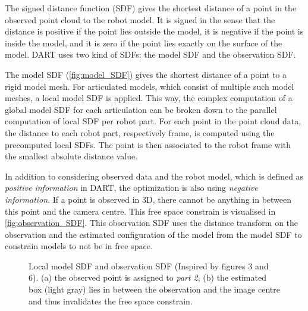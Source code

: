 The signed distance function (SDF) gives the shortest distance of a point in the observed point cloud to the robot model. It is signed in the sense that the distance is positive if the point lies outside the model, it is negative if the point is inside the model, and it is zero if the point lies exactly on the surface of the model. DART uses two kind of SDFs: the model SDF and the observation SDF.

The model SDF (\cref{fig:model_SDF}) gives the shortest distance of a point to a rigid model mesh. For articulated models, which consist of multiple such model meshes, a local model SDF is applied. This way, the complex computation of a global model SDF for each articulation can be broken down to the parallel computation of local SDF per robot part. For each point in the point cloud data, the distance to each robot part, respectively frame, is computed using the precomputed local SDFs. The point is then associated to the robot frame with the smallest absolute distance value.

In addition to considering observed data and the robot model, which is defined as \textit{positive information} in DART, the optimization is also using \textit{negative information}. If a point is observed in 3D, there cannot be anything in between this point and the camera centre. This free space constrain is visualised in \cref{fig:observation_SDF}. This observation SDF uses the distance transform on the observation and the estimated configuration of the model from the model SDF to constrain models to not be in free space.

\begin{figure}
\centering
{}
\caption[Signed Distance Function]{Local model SDF and observation SDF (Inspired by \cite{Schmidt2015} figures 3 and 6). (a) the observed point is assigned to \emph{part 2}, (b) the estimated box (light gray) lies in between the observation and the image centre and thus invalidates the free space constrain.}
\end{figure}


